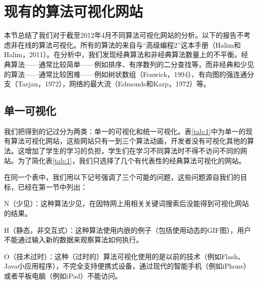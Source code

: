 \chapter{现有的算法可视化网站}
\begin{sectext}
本节总结了我们对于截至2012年4月不同算法可视化网站的分析。以下的报告不考虑非在线的算法可视化。所有的算法的来自与``高级编程2''这本手册（Halim和Halim，2011）。在分析中，我们发现经典算法和非经典算法数量上的不平衡。经典算法——通常比较简单——例如排序、有序数列的二分查找等，而非经典和少见的算法——通常比较困难——例如树状数组（Fenwick，1994）、有向图的强连通分支（Tarjan，1972），网络的最大流（Edmonds和Karp，1972）等。
\end{sectext}
\section{单一可视化}
\begin{sectext}
我们把得到的记过分为两类：单一的可视化和统一可视化。表\ref{tab:1}中为单一的现有算法可视化网站，这些网站只有一到三个算法动画，开发者没有可视化其他的算法。这增加了学生的学习的负担，学生们在学习不同算法时不得不访问不同的网站。为了简化表\ref{tab:1}，我们只选择了几个有代表性的经典算法可视化的网站。

在同一个表中，我们用以下记号强调了三个可能的问题，这些问题源自我们的目标，已经在第一节中列出：
\begin{itemlist}
\item N（少见）：这种算法少见，在因特网上用相关关键词搜索后没能得到可视化网站的结果。

\item H（静态，非交互式）：这种算法使用内嵌的例子（包括使用动态的GIF图），用户不能通过输入新的数据来观察算法如何执行。

\item O（技术过时）：这种（过时的）算法可视化使用的是以前的技术（例如Flash、Java小应用程序），不完全支持便携式设备，通过现代的智能手机（例如iPhone）或者平板电脑（例如iPad）不能访问。

\end{itemlist}

\end{sectext}
